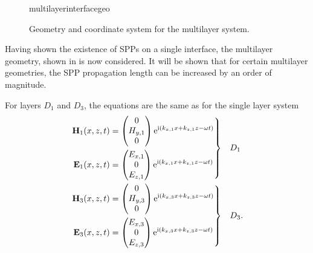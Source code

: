 \begin{figure}[ht]
 \centering
 {multilayerinterfacegeo}
 \caption{Geometry and coordinate system for the multilayer system. }
 \label{fig:multilayergeo}
\end{figure}

Having shown the existence of SPPs on a single interface, the multilayer
geometry, shown in  is now considered.  It will
be shown that for certain multilayer geometries, the SPP propagation length
can be increased by an order of magnitude.

For layers $D_1$ and $D_3$, the equations are the same as for the single layer system
\begin{align}
\left.\begin{aligned}
\mathbf{H}_1(x,z,t) &=
\begin{pmatrix}
0\\
H_{y,1}\\
0
\end{pmatrix} {\mathrm{e}}^{{\mathrm{i}}(k_{x,1}x+k_{z,1}z-\omega t)}\\
\mathbf{E}_1(x,z,t) &=
\begin{pmatrix}
E_{x,1}\\
0\\
E_{z,1}\\
\end{pmatrix} {\mathrm{e}}^{{\mathrm{i}}(k_{x,1}x+k_{z,1}z-\omega t)}
\end{aligned}
\right\}& \quad D_1\label{eqn:lrsppplanewavedielectric}\\
\left.\begin{aligned}
\mathbf{H}_3(x,z,t) &=
\begin{pmatrix}
0\\
H_{y,3}\\
0
\end{pmatrix}
{\mathrm{e}}^{{\mathrm{i}}(k_{x,3}x+k_{z,3}z-\omega t)}\\
\mathbf{E}_3(x,z,t) &=
\begin{pmatrix}
E_{x,3}\\
0\\
E_{z,3}\\
\end{pmatrix}
{\mathrm{e}}^{{\mathrm{i}}(k_{x,3}x+k_{z,3}z-\omega t)}
\end{aligned} 
\right\}&\quad D_3.
\label{eqn:lrsppplanewavemetal}
\end{align}


